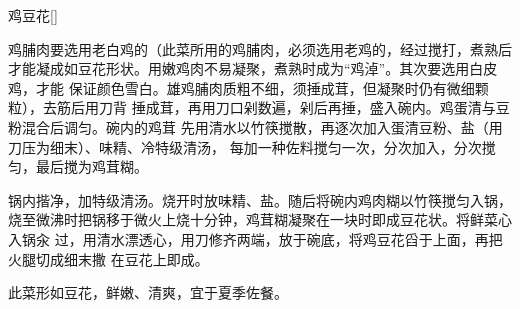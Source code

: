 \begin{recipe}{鸡豆花}[\footnotemark]

\ingredients


\preparation

\step 鸡脯肉要选用老白鸡的（此菜所用的鸡脯肉，必须选用老鸡的，经过搅打，煮熟后
才能凝成如豆花形状。用嫩鸡肉不易凝聚，煮熟时成为“鸡淖”。其次要选用白皮鸡，才能
保证颜色雪白。雄鸡脯肉质粗不细，须捶成茸，但凝聚时仍有微细颗粒），去筋后用刀背
捶成茸，再用刀口剁数遍，剁后再捶，盛入碗内。鸡蛋清与豆粉混合后调匀。碗内的鸡茸
先用清水以竹筷搅散，再逐次加入蛋清豆粉、盐（用刀压为细末）、味精、冷特级清汤，
每加一种佐料搅匀一次，分次加入，分次搅匀，最后搅为鸡茸糊。

\step 锅内揩净，加特级清汤。烧开时放味精、盐。随后将碗内鸡肉糊以竹筷搅匀入锅，
烧至微沸时把锅移于微火上烧十分钟，鸡茸糊凝聚在一块时即成豆花状。将鲜菜心入锅汆
过，用清水漂透心，用刀修齐两端，放于碗底，将鸡豆花舀于上面，再把火腿切成细末撒
在豆花上即成。

\features

此菜形如豆花，鲜嫩、清爽，宜于夏季佐餐。


\end{recipe}

